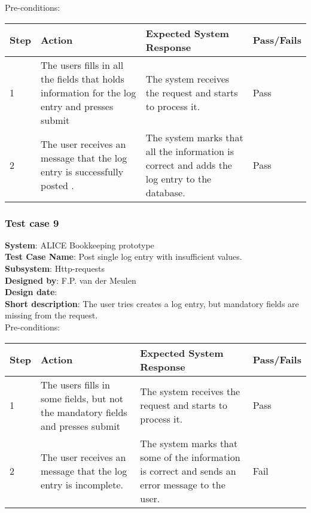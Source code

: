Pre-conditions: \\

\begin{longtable}{ | p{0.8cm} | p{4.5cm} | p{6cm} | p{1.5cm} |}
\hline
Step & Action & Expected System Response & Pass/Fails  \\ \hline
1 & The users fills in all the fields that holds information for the log entry and presses submit & The system receives the request and starts to process it. & Pass \\ \hline
2 & The user receives an message that the log entry is successfully posted . & The system marks that all the information is correct and adds the log entry to the database. & Pass
\end{longtable}
\subsubsection{Test case 9}
\textbf{System}:  ALICE Bookkeeping prototype \\
\textbf{Test Case Name}:  Post single log entry with insufficient values. \\
\textbf{Subsystem}:  Http-requests \\
\textbf{Designed by}:  F.P. van der Meulen\\
\textbf{Design date}:  \\
\textbf{Short description}: The user tries creates a log entry, but mandatory fields are missing from the request. \\

Pre-conditions: \\

\begin{longtable}{ | p{0.8cm} | p{4.5cm} | p{6cm} | p{1.5cm} |}
\hline
Step & Action & Expected System Response & Pass/Fails  \\ \hline
1 & The users fills in some fields, but not the mandatory fields and presses submit & The system receives the request and starts to process it. & Pass \\ \hline
2 & The user receives an message that the log entry is incomplete. & The system marks that some of the information is correct and sends an error message to the user. & Fail
\end{longtable}

